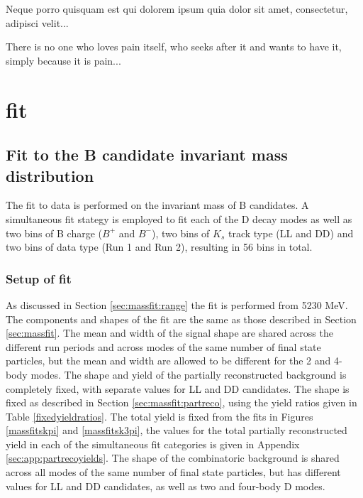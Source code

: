 \clearpage
\begin{savequote}[8cm]
\textlatin{Neque porro quisquam est qui dolorem ipsum quia dolor sit amet, consectetur, adipisci velit...}

There is no one who loves pain itself, who seeks after it and wants to have it, simply because it is pain...
\end{savequote}

\chapter{\label{ch:7-cpfit}\CP fit} 

\minitoc

\section{Fit to the B candidate invariant mass distribution}
\label{sec:cpfit}

The fit to data is performed on the invariant mass of B candidates. A simultaneous fit stategy is employed to fit each of the D decay modes as well as two bins of B charge ($B^+$ and $B^-$), two bins of $K_s$ track type (LL and DD) and two bins of data type (Run 1 and Run 2), resulting in 56 bins in total.

\subsection{Setup of \CP fit}

As discussed in Section \ref{sec:massfit:range} the \CP fit is performed from 5230 MeV. The components and shapes of the \CP fit are the same as those described in Section \ref{sec:massfit}. The mean and width of the signal shape are shared across the different run periods and across modes of the same number of final state particles, but the mean and width are allowed to be different for the 2 and 4-body modes. The shape and yield of the partially reconstructed background is completely fixed, with separate values for LL and DD candidates. The shape is fixed as described in Section \ref{sec:massfit:partreco}, using the yield ratios given in Table \ref{fixedyieldratios}. The total yield is fixed from the fits in Figures \ref{massfitskpi} and \ref{massfitsk3pi}, the values for the total partially reconstructed yield in each of the simultaneous fit categories is given in Appendix \ref{sec:app:partrecoyields}. The shape of the combinatoric background is shared across all modes of the same number of final state particles, but has different values for LL and DD candidates, as well as two and four-body D modes.

